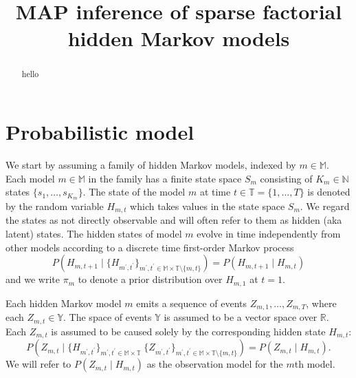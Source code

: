 \documentclass[twoside, 11pt]{article}
\newcommand{\mm}[0] {\mathbb{M}} %
\newcommand{\TT}[0] {\mathbb{T}} %
\newcommand{\reals}[0] {\mathbb{R}}
\newcommand{\naturals}[0] {\mathbb{N}}
\newcommand{\events}[0] {\mathbb{Y}}
\begin{document}
\title{MAP inference of sparse factorial hidden Markov models}

\maketitle

\begin{abstract}%
hello
\end{abstract}

\section{Probabilistic model}
We start by assuming a family of hidden Markov models, indexed by $m \in \mm$. Each model $m \in \mm$ in the family has a finite state space $S_m$ consisting of $K_m \in \naturals$ states $\{s_1, \ldots, s_{K_m}\}$. The state of the model $m$ at time $t \in \TT = \{ 1, \ldots, T \}$ is denoted by the random variable $H_{m, t}$ which takes values in the state space $S_m$. We regard the states as not directly observable and will often refer to them as hidden (aka latent) states. The hidden states of model $m$ evolve in time independently from other models according to a discrete time first-order Markov process
\begin{equation}
P(H_{m,t+1} \mid \{ H_{m^{\prime},t^{\prime}} \}_{m^{\prime}, t^{\prime} \in \mm \times \TT \setminus \{m, t\}} )
=
P(H_{m,t+1} \mid H_{m,t} )
\end{equation}
and we write $\pi_m$ to denote a prior distribution over $H_{m,1}$ at $t=1$.

Each hidden Markov model $m$ emits a sequence of events $Z_{m,1}, \ldots, Z_{m,T}$, where each $Z_{m,t} \in \events$. The space of events $\events$ is assumed to be a vector space over $\reals$. Each $Z_{m,t}$ is assumed to be caused solely by the corresponding hidden state $H_{m,t}$:
\begin{equation}
P\left(Z_{m,t}
\mid
\{ H_{m^{\prime},t^{\prime}} \}_{m^{\prime}, t^{\prime} \in \mm \times \TT} \;
\{ Z_{m^{\prime},t^{\prime}} \}_{m^{\prime}, t^{\prime} \in \mm \times \TT \setminus \{m, t\}}
\right)
=
P(Z_{m,t} \mid H_{m,t} ) .
\end{equation}
We will refer to $P(Z_{m, t} \mid H_{m,t} )$ as the observation model for the $m$th model.

\end{document}
